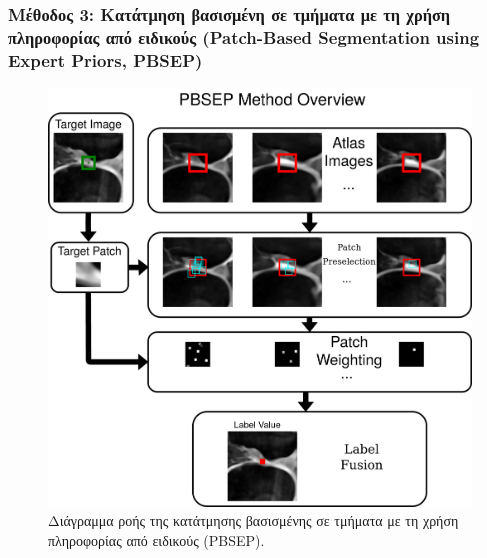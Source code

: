 \documentclass{beamer}
\begin{document}
\begin{frame}
\frametitle{Μέθοδος 3: Κατάτμηση βασισμένη σε τμήματα με τη χρήση
πληροφορίας από ειδικούς (Patch-Based Segmentation using Expert Priors, PBSEP)}

\begin{figure}[H]
    \centering
    \includegraphics[height=0.8\textheight]{PBSEP_method.png}
    \caption{Διάγραμμα ροής της κατάτμησης βασισμένης σε τμήματα με τη χρήση
             πληροφορίας από ειδικούς (PBSEP).}
\end{figure}

\end{frame}
\end{document}
